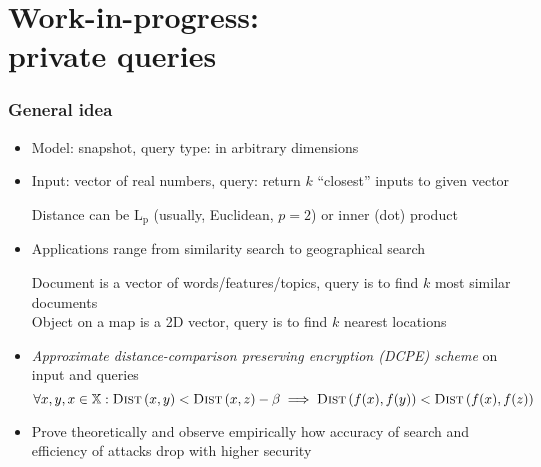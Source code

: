\section{Work-in-progress: \\ private \knn{} queries}

	\begin{frame}[label={frame:knn}]

		\frametitle{General idea}

		\begin{itemize}
			\item<1->
				Model: \alert{snapshot}, query type: \alert{\knn{}} in arbitrary dimensions

			\item<2->
				Input: vector of real numbers, query: return $k$ ``closest'' inputs to given vector \\
				\begin{small}
					Distance can be $\text{L}_\text{p}$ (usually, Euclidean, $p = 2$) or inner (dot) product
				\end{small}

			\item<3->
				Applications range from similarity search to geographical search \\
				\begin{small}
					Document is a vector of words/features/topics, query is to find $k$ most similar documents \\
					Object on a map is a 2D vector, query is to find $k$ nearest locations
				\end{small}

			\item<4->
				\emph{Approximate distance-comparison preserving encryption (DCPE) scheme} on input and queries
				\[
					\forall x, y, x \in \mathbb{X} : \algo{Dist}{x, y} < \algo{Dist}{x, z} - \beta \implies \algo{Dist}{f(x), f(y)} < \algo{Dist}{f(x), f(z)}
				\]

			\item<5->
				Prove theoretically and observe empirically how accuracy of search and efficiency of attacks drop with higher security \\
				\begin{small}
					\hyperlink{frame:appendix:dcpe}{}
					\hyperlink{frame:appendix:trec-faiss}{}
					\hyperlink{frame:appendix:knn-plot}{}
				\end{small}

		\end{itemize}

	\end{frame}
